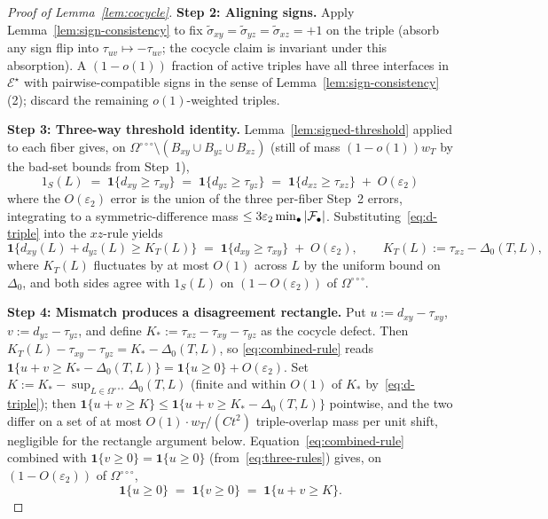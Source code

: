 \begin{proof}[Proof of Lemma~\ref{lem:cocycle}]
\textbf{Step 2: Aligning signs.}
Apply Lemma~\ref{lem:sign-consistency} to fix
$\widetilde\sigma_{xy}=\widetilde\sigma_{yz}=\widetilde\sigma_{xz}=+1$
on the triple (absorb any sign flip into
$\tau_{uv}\mapsto-\tau_{uv}$; the cocycle claim is invariant under
this absorption).  A $(1-o(1))$ fraction of active triples have all
three interfaces in $\mathcal{E}^\star$ with pairwise-compatible signs
in the sense of Lemma~\ref{lem:sign-consistency}(2); discard the
remaining $o(1)$-weighted triples.

\textbf{Step 3: Three-way threshold identity.}
Lemma~\ref{lem:signed-threshold} applied to each fiber gives, on
$\Omega^{\circ\circ\circ}\setminus(B_{xy}\cup B_{yz}\cup B_{xz})$
(still of mass $(1-o(1))w_T$ by the bad-set bounds from Step~1),
\begin{equation}\label{eq:three-rules}
  1_S(L)\;=\;
  \mathbf{1}\{d_{xy}\ge\tau_{xy}\}\;=\;
  \mathbf{1}\{d_{yz}\ge\tau_{yz}\}\;=\;
  \mathbf{1}\{d_{xz}\ge\tau_{xz}\}
  \;+\;O(\varepsilon_2)
\end{equation}
where the $O(\varepsilon_2)$ error is the union of the three per-fiber
Step~2 errors, integrating to a symmetric-difference mass
$\le 3\varepsilon_2\min_\bullet|\mathcal{F}_{\bullet}|$.
Substituting~\eqref{eq:d-triple} into the $xz$-rule yields
\begin{equation}\label{eq:combined-rule}
  \mathbf{1}\{d_{xy}(L)+d_{yz}(L)\ge K_T(L)\}
  \;=\;\mathbf{1}\{d_{xy}\ge\tau_{xy}\}
  \;+\;O(\varepsilon_2),
  \qquad K_T(L):=\tau_{xz}-\Delta_0(T,L),
\end{equation}
where $K_T(L)$ fluctuates by at most $O(1)$ across $L$ by the uniform
bound on $\Delta_0$, and both sides agree with $1_S(L)$ on
$(1-O(\varepsilon_2))$ of $\Omega^{\circ\circ\circ}$.

\textbf{Step 4: Mismatch produces a disagreement rectangle.}
Put $u:=d_{xy}-\tau_{xy}$, $v:=d_{yz}-\tau_{yz}$, and define
$K_*:=\tau_{xz}-\tau_{xy}-\tau_{yz}$ as the cocycle defect.  Then
$K_T(L)-\tau_{xy}-\tau_{yz}=K_*-\Delta_0(T,L)$, so \eqref{eq:combined-rule}
reads
$\mathbf{1}\{u+v\ge K_*-\Delta_0(T,L)\}=\mathbf{1}\{u\ge 0\}+O(\varepsilon_2)$.
Set $K:=K_*-\sup_{L\in\Omega^{\circ\circ\circ}}\Delta_0(T,L)$ (finite
and within $O(1)$ of $K_*$ by~\eqref{eq:d-triple}); then
$\mathbf{1}\{u+v\ge K\}\le\mathbf{1}\{u+v\ge K_*-\Delta_0(T,L)\}$
pointwise, and the two differ on a set of at most
$O(1)\cdot w_T/(Ct^2)$ triple-overlap mass per unit shift, negligible
for the rectangle argument below.
Equation~\eqref{eq:combined-rule} combined with
$\mathbf{1}\{v\ge 0\}=\mathbf{1}\{u\ge 0\}$ (from~\eqref{eq:three-rules})
gives, on $(1-O(\varepsilon_2))$ of $\Omega^{\circ\circ\circ}$,
\begin{equation}\label{eq:uv-rule}
  \mathbf{1}\{u\ge 0\}\;=\;\mathbf{1}\{v\ge 0\}
  \;=\;\mathbf{1}\{u+v\ge K\}.
\end{equation}


\end{proof}
